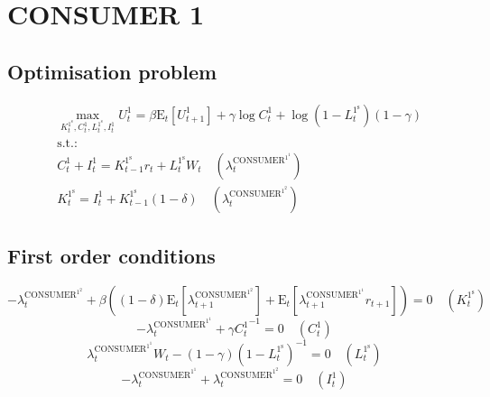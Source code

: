 

\section{CONSUMER 1}

\subsection{Optimisation problem}

\begin{align}
&\max_{K^{\mathrm{1}^{\mathrm{s}}}_{t}, C^{\mathrm{1}}_{t}, L^{\mathrm{1}^{\mathrm{s}}}_{t}, I^{\mathrm{1}}_{t}
} U^{\mathrm{1}}_{t} = {\beta} {\mathrm{E}_{t}\left[U^{\mathrm{1}}_{t+1}\right]} + {\gamma} {\log{C^{\mathrm{1}}_{t}}} + {\log\left(1 - L^{\mathrm{1}^{\mathrm{s}}}_{t}\right)} \left(1 - \gamma\right)\\
&\mathrm{s.t.:}\nonumber\\
& C^{\mathrm{1}}_{t} + I^{\mathrm{1}}_{t} = {K^{\mathrm{1}^{\mathrm{s}}}_{t-1}} {r_{t}} + {L^{\mathrm{1}^{\mathrm{s}}}_{t}} {W_{t}} \quad \left(\lambda^{\mathrm{CONSUMER}^{\mathrm{1}^{\mathrm{1}}}}_{t}\right)\\
& K^{\mathrm{1}^{\mathrm{s}}}_{t} = I^{\mathrm{1}}_{t} + {K^{\mathrm{1}^{\mathrm{s}}}_{t-1}} \left(1 - \delta\right) \quad \left(\lambda^{\mathrm{CONSUMER}^{\mathrm{1}^{\mathrm{2}}}}_{t}\right)
\end{align}


\subsection{First order conditions}

\begin{equation}
-\lambda^{\mathrm{CONSUMER}^{\mathrm{1}^{\mathrm{2}}}}_{t} + {\beta} \left(\left(1 - \delta\right) {\mathrm{E}_{t}\left[\lambda^{\mathrm{CONSUMER}^{\mathrm{1}^{\mathrm{2}}}}_{t+1}\right]} + \mathrm{E}_{t}\left[{\lambda^{\mathrm{CONSUMER}^{\mathrm{1}^{\mathrm{1}}}}_{t+1}} {r_{t+1}}\right]\right) = 0
 \quad \left(K^{\mathrm{1}^{\mathrm{s}}}_{t}\right)
\end{equation}
\begin{equation}
-\lambda^{\mathrm{CONSUMER}^{\mathrm{1}^{\mathrm{1}}}}_{t} + {\gamma} {C^{\mathrm{1}}_{t}}^{-1} = 0
 \quad \left(C^{\mathrm{1}}_{t}\right)
\end{equation}
\begin{equation}
{\lambda^{\mathrm{CONSUMER}^{\mathrm{1}^{\mathrm{1}}}}_{t}} {W_{t}} - \left(1 - \gamma\right) \left(1 - L^{\mathrm{1}^{\mathrm{s}}}_{t}\right)^{-1} = 0
 \quad \left(L^{\mathrm{1}^{\mathrm{s}}}_{t}\right)
\end{equation}
\begin{equation}
-\lambda^{\mathrm{CONSUMER}^{\mathrm{1}^{\mathrm{1}}}}_{t} + \lambda^{\mathrm{CONSUMER}^{\mathrm{1}^{\mathrm{2}}}}_{t} = 0
 \quad \left(I^{\mathrm{1}}_{t}\right)
\end{equation}




